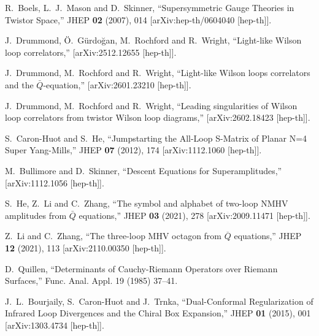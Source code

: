 \documentclass[12pt]{article}
\numberwithin{equation}{section}
\begin{document}
\begin{thebibliography}{}
R.~Boels, L.~J.~Mason and D.~Skinner,
``Supersymmetric Gauge Theories in Twistor Space,''
JHEP \textbf{02} (2007), 014
[arXiv:hep-th/0604040 [hep-th]].

J.~Drummond, {\"O}.~G{\"u}rdo{\u{g}}an, M.~Rochford and R.~Wright,
``Light-like Wilson loop correlators,''
[arXiv:2512.12655 [hep-th]].

J.~Drummond, M.~Rochford and R.~Wright,
``Light-like Wilson loops correlators and the $\bar{Q}$-equation,''
[arXiv:2601.23210 [hep-th]].

J.~Drummond, M.~Rochford and R.~Wright,
``Leading singularities of Wilson loop correlators from twistor Wilson loop diagrams,''
[arXiv:2602.18423 [hep-th]].

S.~Caron-Huot and S.~He,
``Jumpstarting the All-Loop S-Matrix of Planar N=4 Super Yang-Mills,''
JHEP \textbf{07} (2012), 174
[arXiv:1112.1060 [hep-th]].

M.~Bullimore and D.~Skinner,
``Descent Equations for Superamplitudes,''
[arXiv:1112.1056 [hep-th]].

S.~He, Z.~Li and C.~Zhang,
``The symbol and alphabet of two-loop NMHV amplitudes from $\bar{Q}$ equations,''
JHEP \textbf{03} (2021), 278
[arXiv:2009.11471 [hep-th]].

Z.~Li and C.~Zhang,
``The three-loop MHV octagon from $ \overline{Q} $ equations,''
JHEP \textbf{12} (2021), 113
[arXiv:2110.00350 [hep-th]].

D.~Quillen,
``Determinants of Cauchy-Riemann Operators over Riemann Surfaces,''
Func. Anal. Appl. 19 (1985) 37–41.

J.~L.~Bourjaily, S.~Caron-Huot and J.~Trnka,
``Dual-Conformal Regularization of Infrared Loop Divergences and the Chiral Box Expansion,''
JHEP \textbf{01} (2015), 001
[arXiv:1303.4734 [hep-th]].


\end{thebibliography}
\end{document}
